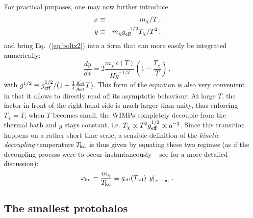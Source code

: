 For practical purposes, one may now further introduce
\begin{eqnarray}
   x &\equiv& m_\chi/T\,,\\
   y &\equiv& m_\chi g_{\rm eff}^{-1/2} T_\chi/T^2\,,
\end{eqnarray}
and bring Eq.~(\ref{eq:boltz2}) into a form that can more easily be integrated numerically:
\begin{equation}
  \label{eq:process}
  \frac{dy}{dx} = 2\frac{m_\chi\, c(T)}{H\tilde g^{-1/2}}\left(1-\frac{T_\chi}{T}\right)\,,
\end{equation}
with $\tilde g^{1/2}\equiv g_{\rm eff}^{1/2}/(1+\frac{1}{4}\frac{g_{\rm eff}'}{g_{\rm eff}}T)$. 
This form of the equation is also very convenient in that it allows to directly read off 
its asymptotic behaviour: 
At large $T$, the factor in front of the right-hand side is much larger than unity, thus enforcing
$T_\chi=T$; when $T$ becomes small, the WIMPs completely decouple from the thermal 
bath and $y$ stays constant, i.e. $T_\chi\propto T^2 g_{\rm eff}^{1/2}\propto a^{-2}$. 
Since this transition happens on a rather short time scale, a sensible definition of 
the \emph{kinetic decoupling} temperature $T_{\rm kd}$ is thus given by equating these 
two regimes (as if the decoupling process were to occur instantaneously -- 
see \cite{Bringmann:2009vf}  for a more detailed discussion):
\begin{equation}
  \label{eq:tkddef}
  x_{\rm kd}=\frac{m_\chi}{T_{\rm kd}}\equiv g_{\rm eff}(T_{\rm kd})\, \left.y\right|_{x\rightarrow\infty}\,.
\end{equation}





\subsection{The smallest protohalos}


